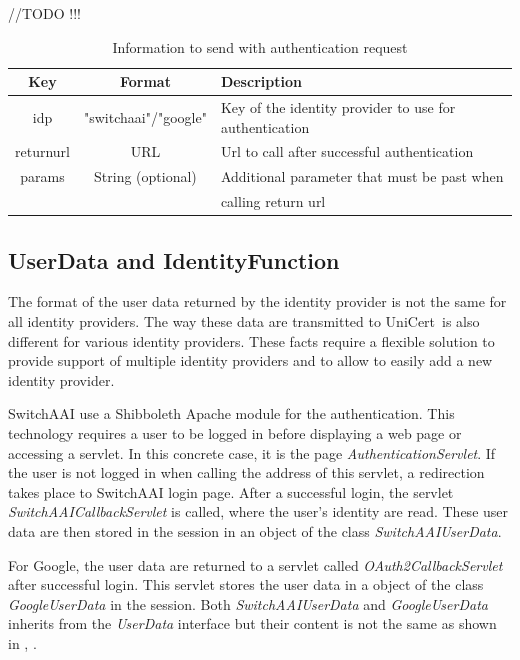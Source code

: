 \documentclass[oneside]{scrreprt}
\newcommand{\unicert}{\mbox{UniCert}}
\begin{document}
//TODO !!!
\begin{table}[ht]
\centering
\begin{tabular}{|c|c|l|}
  \hline
  Key & Format & Description\\
  \hline
  idp & "switchaai"/"google" & Key of the identity provider to use for authentication\\
  returnurl & URL & Url to call after successful authentication\\
  params & String (optional) & Additional parameter that must be past when\\ & & calling return url\\
  \hline
\end{tabular}
\caption{Information to send with authentication request}
\label{t:rsa}
\end{table}



\subsection{UserData and IdentityFunction}

The format of the user data returned by the identity provider is not the same for all identity providers. The way these data are transmitted to \unicert\ is also different for various identity providers. These facts require a flexible solution to provide support of multiple identity providers and to allow to easily add a new identity provider.

SwitchAAI use a Shibboleth Apache module for the authentication. This technology requires a user to be logged in before displaying a web page or accessing a servlet. In this concrete case, it is the page \textit{AuthenticationServlet}. If the user is not logged in when calling the address of this servlet, a redirection takes place to SwitchAAI login page. After a successful login, the servlet \textit{SwitchAAICallbackServlet} is called, where the user's identity are read. These user data are then stored in the session in an object of the class \textit{SwitchAAIUserData}.

For Google, the user data are returned to a servlet called \textit{OAuth2CallbackServlet} after successful login. This servlet stores the user data in a object of the class \textit{GoogleUserData} in the session. Both \textit{SwitchAAIUserData} and \textit{GoogleUserData} inherits from the \textit{UserData} interface but their content is not the same as shown in , .
\end{document}

